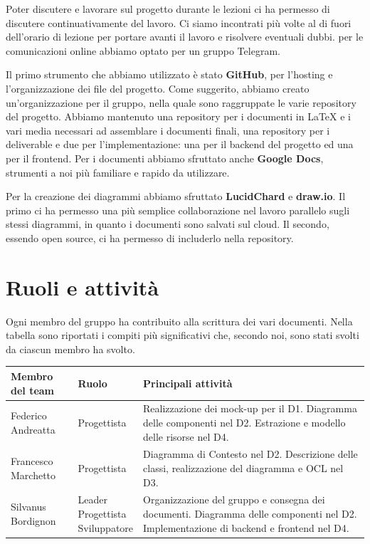 \documentclass[a4paper,12pt]{article}
\begin{document}
Poter discutere e lavorare sul progetto durante le lezioni ci ha permesso di discutere continuativamente del lavoro. Ci siamo incontrati più volte al di fuori dell'orario di lezione per portare avanti il lavoro e risolvere eventuali dubbi. per le comunicazioni online abbiamo optato per un gruppo Telegram.

Il primo strumento che abbiamo utilizzato è stato \textbf{GitHub}, per l'hosting e l'organizzazione dei file del progetto. Come suggerito, abbiamo creato un'organizzazione per il gruppo, nella quale sono raggruppate le varie repository del progetto. Abbiamo mantenuto una repository per i documenti in LaTeX e i vari media necessari ad assemblare i documenti finali, una repository per i deliverable e due per l'implementazione: una per il backend del progetto ed una per il frontend. Per i documenti abbiamo sfruttato anche \textbf{Google Docs}, strumenti a noi più familiare e rapido da utilizzare.

Per la creazione dei diagrammi abbiamo sfruttato \textbf{LucidChard} e \textbf{draw.io}. Il primo ci ha permesso una più semplice collaborazione nel lavoro parallelo sugli stessi diagrammi, in quanto i documenti sono salvati sul cloud. Il secondo, essendo open source, ci ha permesso di includerlo nella repository.

\section{Ruoli e attività}

Ogni membro del gruppo ha contribuito alla scrittura dei vari documenti. Nella tabella sono riportati i compiti più significativi che, secondo noi, sono stati svolti da ciascun membro ha svolto.


\begin{tabular}{|p{4cm}|p{2.4cm}|p{8cm}|}
    \hline
    \textbf{Membro del team} & \textbf{Ruolo} & \textbf{Principali attività} \\ \hline
    Federico Andreatta & Progettista & Realizzazione dei mock-up per il D1. Diagramma delle componenti nel D2. Estrazione e modello delle risorse nel D4. \\ \hline
    Francesco Marchetto & Progettista & Diagramma di Contesto nel D2. Descrizione delle classi, realizzazione del diagramma e OCL nel D3. \\ \hline
    Silvanus Bordignon & \makecell[l]{Leader \\ Progettista \\ Sviluppatore} & Organizzazione del gruppo e consegna dei documenti. Diagramma delle componenti nel D2. Implementazione di backend e frontend nel D4. \\ \hline
\end{tabular}
\end{document}
